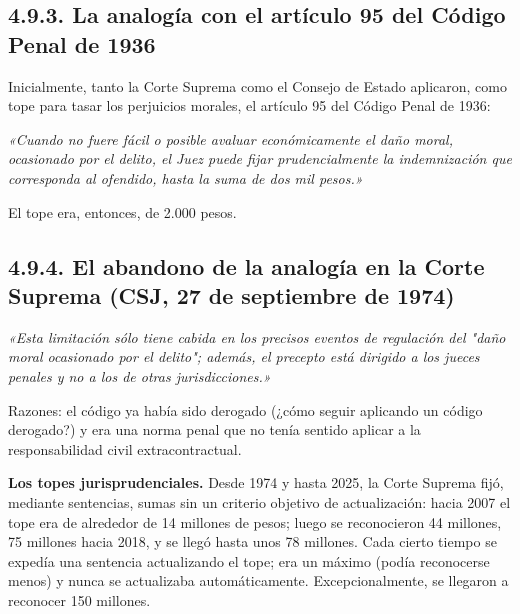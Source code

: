 \subsection{4.9.3. La analogía con el artículo 95 del Código Penal de 1936}
Inicialmente, tanto la Corte Suprema como el Consejo de Estado aplicaron, como tope para tasar los perjuicios morales, el artículo 95 del Código Penal de 1936:

\begin{cita}
\textit{«Cuando no fuere fácil o posible avaluar económicamente el daño moral, ocasionado por el delito, el Juez puede fijar prudencialmente la indemnización que corresponda al ofendido, hasta la suma de dos mil pesos.»}
\end{cita}
El tope era, entonces, de 2.000 pesos.

\subsection{4.9.4. El abandono de la analogía en la Corte Suprema (CSJ, 27 de septiembre de 1974)}
\begin{cita}
\textit{«Esta limitación sólo tiene cabida en los precisos eventos de regulación del "daño moral ocasionado por el delito"; además, el precepto está dirigido a los jueces penales y no a los de otras jurisdicciones.»}
\end{cita}
Razones: el código ya había sido derogado (¿cómo seguir aplicando un código derogado?) y era una norma penal que no tenía sentido aplicar a la responsabilidad civil extracontractual.

\textbf{Los topes jurisprudenciales.} Desde 1974 y hasta 2025, la Corte Suprema fijó, mediante sentencias, sumas sin un criterio objetivo de actualización: hacia 2007 el tope era de alrededor de 14 millones de pesos; luego se reconocieron 44 millones, 75 millones hacia 2018, y se llegó hasta unos 78 millones. Cada cierto tiempo se expedía una sentencia actualizando el tope; era un máximo (podía reconocerse menos) y nunca se actualizaba automáticamente. Excepcionalmente, se llegaron a reconocer 150 millones.

